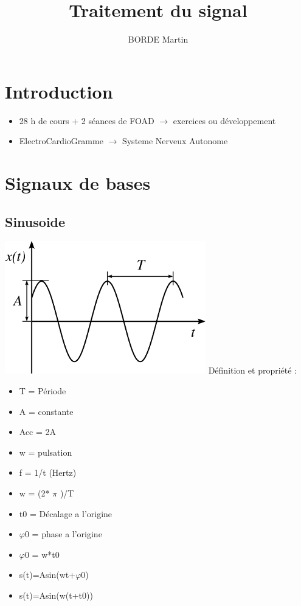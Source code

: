\documentclass{article}
\title{Traitement du signal}
\author{BORDE Martin}
\begin{document}
\maketitle

\section{Introduction}

\begin{itemize}
\item 28 h de cours + 2 s\'eances de FOAD $ \rightarrow $ exercices ou d\'eveloppement 
\item ElectroCardioGramme $ \rightarrow $  Systeme Nerveux Autonome
\end{itemize}

\section{Signaux de bases}
\subsection{Sinusoide}
\includegraphics{img/sinus.png}
\newline \newline
D\'efinition et propri\'et\'e :
\begin{itemize}[label=\textbullet]
\item T = P\'eriode
\item A = constante
\item Acc = 2A
\item w = pulsation
\item f = 1/t (Hertz)
\item w = (2* $ \pi $ )/T
\item t0 = D\'ecalage a l'origine
\item $ \varphi $0 = phase a l'origine
\item $ \varphi $0 = w*t0
\item s(t)=Asin(wt+$\varphi$0)
\item s(t)=Asin(w(t+t0))
\end{itemize}
\end{document}
